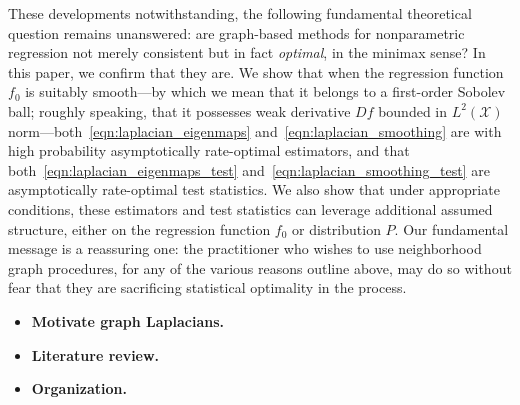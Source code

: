 \documentclass{article}
\newcommand{\1}{\mathbf{1}}
\newcommand{\Xset}{\mathcal{X}}
\theoremstyle{alden}
\theoremstyle{aldenthm}
\theoremstyle{definition}
\theoremstyle{remark}
\begin{document}
These developments notwithstanding, the following fundamental theoretical question remains unanswered: are graph-based methods for nonparametric regression not merely consistent but in fact \emph{optimal}, in the minimax sense? In this paper, we confirm that they are. We show that when the regression function $f_0$ is suitably smooth---by which we mean that it belongs to a first-order Sobolev ball; roughly speaking, that it possesses weak derivative $Df$ bounded in $L^2(\Xset)$ norm---both~\eqref{eqn:laplacian_eigenmaps} and~\eqref{eqn:laplacian_smoothing} are with high probability asymptotically rate-optimal estimators, and that both~\eqref{eqn:laplacian_eigenmaps_test} and~\eqref{eqn:laplacian_smoothing_test} are asymptotically rate-optimal test statistics. We also show that under appropriate conditions, these estimators and test statistics can leverage additional assumed structure, either on the regression function $f_0$ or distribution $P$. Our fundamental message is a reassuring one: the practitioner who wishes to use neighborhood graph procedures, for any of the various reasons outline above, may do so without fear that they are sacrificing statistical optimality in the process.

\begin{itemize}
	\item \textbf{Motivate graph Laplacians.} 
	
	\item \textbf{Literature review.} 
	\item \textbf{Organization.}
\end{itemize}
\end{document}
